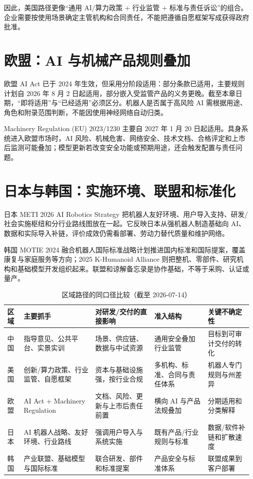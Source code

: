 因此，美国路径更像“通用 AI/算力政策 + 行业监管 + 标准与责任诉讼”的组合。企业需要按使用场景确定主管机构和合同责任，不能把遵循自愿框架写成获得政府批准。

\section{欧盟：AI 与机械产品规则叠加}

欧盟 AI Act 已于 2024 年生效，但采用分阶段适用：部分条款已适用，主要规则计划自 2026 年 8 月 2 日起适用，部分嵌入受监管产品的义务更晚\cite{eu2024aiact}。截至本章日期，“即将适用”与“已经适用”必须区分。机器人是否属于高风险 AI 需根据用途、角色和附录范围判断，不能因使用神经网络自动归类。

Machinery Regulation (EU) 2023/1230 主要自 2027 年 1 月 20 日起适用\cite{eu2023machinery}。具身系统进入欧盟市场时，AI 风险、机械危害、网络安全、技术文档、合格评定和上市后监测可能叠加；模型更新若改变安全功能或预期用途，还会触发配置与责任问题。

\section{日本与韩国：实施环境、联盟和标准化}

日本 METI 2026 AI Robotics Strategy 把机器人友好环境、用户导入支持、研发/社会实施枢纽和分行业路线图放在一起\cite{meti2026robotics}。它反映日本从强机器人制造基础向 AI、数据和实际导入补链，评价成效仍需看部署、劳动力替代质量和维护网络。

韩国 MOTIE 2024 融合机器人国际标准战略计划推进国内标准和国际提案，覆盖康复与家庭服务等方向\cite{motie2024standards}；2025 K-Humanoid Alliance 则把整机、零部件、研究机构和基础模型开发组织起来\cite{motie2025humanoid}。联盟和谅解备忘录是协作基础，不等于采购、认证或量产。

\begin{table}[H]
\begingroup{}
\centering\small
\caption{区域路径的同口径比较（截至 2026-07-14）}
\label{tab:regional-policy-matrix}
\begin{tabularx}{\textwidth}{p{}YYYY}
\toprule
区域 & 主要抓手 & 对研发/交付的直接影响 & 准入结构 & 关键不确定性 \\
\midrule
中国 & 指导意见、公共平台、实景实训 & 场景、供应链、数据与中试资源 & 通用安全叠加行业监管 & 目标到可审计交付的转化 \\
美国 & 创新/算力政策、行业监管、自愿框架 & 资本与基础设施强，按行业合规 & 多机构、标准、合同与责任体系 & 机器人专门规则与州差异 \\
欧盟 & AI Act + Machinery Regulation & 文档、风险、更新与上市后责任前置 & 横向 AI 与产品法规叠加 & 分期适用和分类解释 \\
日本 & AI 机器人战略、友好环境、行业路线 & 强调用户导入与系统实施 & 既有产品/行业规则与标准 & 数据/软件补链和扩散速度 \\
韩国 & 产业联盟、基础模型与国际标准 & 联合研发、部件和标准提案 & 产品安全与标准体系 & 联盟成果到客户部署 \\
\bottomrule
\end{tabularx}
\endgroup
\end{table}

